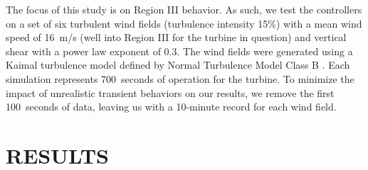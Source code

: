 \documentclass[letterpaper, 10 pt, conference]{ieeeconf}  %
\begin{document}
The focus of this study is on Region III behavior. As such, we test the controllers on a set of six turbulent wind fields (turbulence intensity 15\%) with a mean wind speed of 16~m/s (well into Region III for the turbine in question) and vertical shear with a power law exponent of 0.3. The wind fields were generated using a Kaimal turbulence model defined by Normal Turbulence Model Class B \cite{Jonkman2009}. Each simulation represents 700~seconds of operation for the turbine. To minimize the impact of unrealistic transient behaviors on our results, we remove the first 100~seconds of data, leaving us with a 10-minute record for each wind field.

\section{RESULTS}\label{sec:Results}
\end{document}
